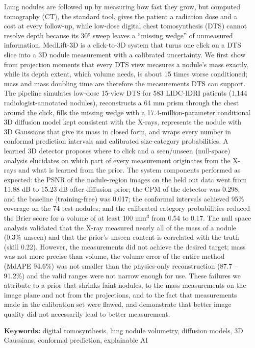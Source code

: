 
Lung nodules are followed up by measuring how fast they grow, but computed tomography (CT), the standard tool, gives the patient a radiation dose and a cost at every follow-up, while low-dose digital chest tomosynthesis (DTS) cannot resolve depth because its \ang{30} sweep leaves a ``missing wedge'' of unmeasured information. MedLift-3D is a click-to-3D system that turns one click on a DTS slice into a 3D nodule measurement with a calibrated uncertainty. We first show from projection moments that every DTS view measures a nodule's mass exactly, while its depth extent, which volume needs, is about 15 times worse conditioned; mass and mass doubling time are therefore the measurements DTS can support. The pipeline simulates low-dose 15-view DTS for 583 LIDC-IDRI patients (1,144 radiologist-annotated nodules), reconstructs a 64 mm prism through the chest around the click, fills the missing wedge with a 17.4-million-parameter conditional 3D diffusion model kept consistent with the X-rays, represents the nodule with 3D Gaussians that give its mass in closed form, and wraps every number in conformal prediction intervals and calibrated size-category probabilities. A learned 3D detector proposes where to click and a seen/unseen (null-space) analysis elucidates on which part of every measurement originates from the X-rays and what is learned from the prior. The system components performed as expected: the PSNR of the nodule-region images on the held out data went from 11.88 dB to 15.23 dB after diffusion prior; the CPM of the detector was 0.298, and the baseline (training-free) was 0.017; the conformal intervals achieved 95\% coverage on the 74 test nodules; and the calibrated category probabilities reduced the Brier score for a volume of at least 100 mm$^3$ from 0.54 to 0.17. The null space analysis validated that the X-ray measured nearly all of the mass of a nodule (0.3\% unseen) and that the prior's unseen content is correlated with the truth (skill 0.22). However, the measurements did not achieve the desired target; mass was not more precise than volume, the volume error of the entire method (MdAPE 94.6\%) was not smaller than the physics-only reconstruction (87.7 -- 91.2\%) and the valid ranges were not narrow enough for use. These failures we attribute to a prior that shrinks faint nodules, to the mass measurements on the image plane and not from the projections, and to the fact that measurements made in the calibration set were flawed, and demonstrate that better image quality did not necessarily lead to better measurement.

\vspace{1em}\noindent\textbf{Keywords:} digital tomosynthesis, lung nodule volumetry, diffusion models, 3D Gaussians, conformal prediction, explainable AI
